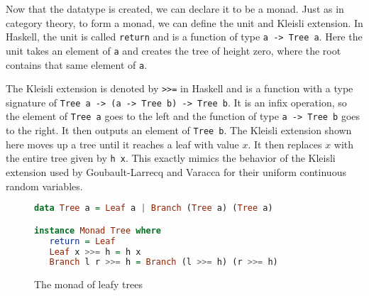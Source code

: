 Now that the datatype is created, we can declare it to be a monad.  Just as in category theory, to form a monad, we can define the unit and Kleisli extension.  In Haskell, the unit is called \texttt{return} and is a function of type \texttt{a -> Tree a}.  Here the unit takes an element of \texttt{a} and creates the tree of height zero, where the root contains that same element of \texttt{a}.

The Kleisli extension is denoted by \texttt{>>=} in Haskell and is a function with a type signature of \texttt{Tree a -> (a -> Tree b) -> Tree b}.  It is an infix operation, so the element of \texttt{Tree a} goes to the left and the function of type \texttt{a -> Tree b} goes to the right.  It then outputs an element of \texttt{Tree b}.  The Kleisli extension shown here  moves up a tree until it reaches a leaf with value $x$.  It then replaces $x$ with the entire tree given by \texttt{h x}.  This exactly mimics the behavior of the Kleisli extension used by Goubault{-}Larrecq and Varacca for their uniform continuous random variables.  
\begin{figure}
\begin{lstlisting}[language=Haskell]
data Tree a = Leaf a | Branch (Tree a) (Tree a)

instance Monad Tree where
   return = Leaf
   Leaf x >>= h = h x
   Branch l r >>= h = Branch (l >>= h) (r >>= h)
\end{lstlisting}
\caption{The monad of leafy trees}
\label{fig:leafytrees}
\end{figure}

